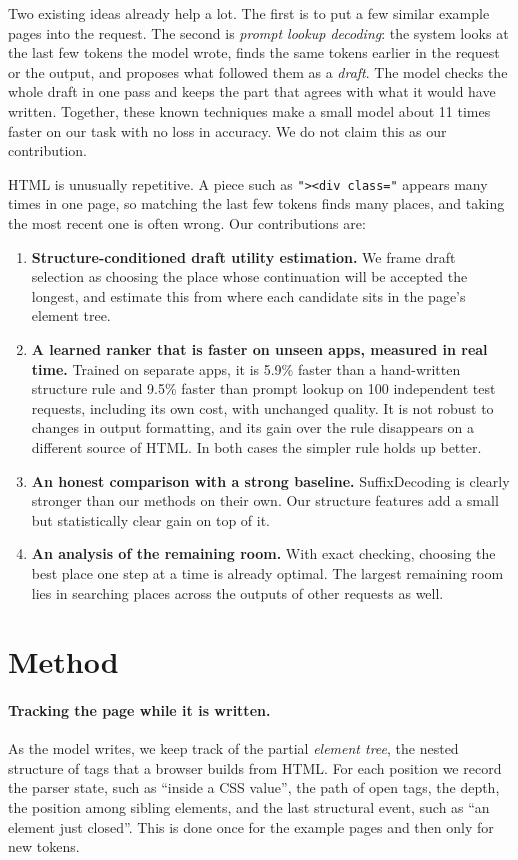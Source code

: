 \documentclass[10pt,a4paper]{article}
\begin{document}
Two existing ideas already help a lot. The first is to put a few similar example pages into the request. The second is \emph{prompt lookup decoding}: the system looks at the last few tokens the model wrote, finds the same tokens earlier in the request or the output, and proposes what followed them as a \emph{draft}. The model checks the whole draft in one pass and keeps the part that agrees with what it would have written. Together, these known techniques make a small model about 11 times faster on our task with no loss in accuracy. We do not claim this as our contribution.

HTML is unusually repetitive. A piece such as \texttt{"><div class="} appears many times in one page, so matching the last few tokens finds many places, and taking the most recent one is often wrong. Our contributions are:
\begin{enumerate}[itemsep=1pt]
\item \textbf{Structure-conditioned draft utility estimation.} We frame draft selection as choosing the place whose continuation will be accepted the longest, and estimate this from where each candidate sits in the page's element tree.
\item \textbf{A learned ranker that is faster on unseen apps, measured in real time.} Trained on separate apps, it is 5.9\% faster than a hand-written structure rule and 9.5\% faster than prompt lookup on 100 independent test requests, including its own cost, with unchanged quality. It is not robust to changes in output formatting, and its gain over the rule disappears on a different source of HTML. In both cases the simpler rule holds up better.
\item \textbf{An honest comparison with a strong baseline.} SuffixDecoding is clearly stronger than our methods on their own. Our structure features add a small but statistically clear gain on top of it.
\item \textbf{An analysis of the remaining room.} With exact checking, choosing the best place one step at a time is already optimal. The largest remaining room lies in searching places across the outputs of other requests as well.
\end{enumerate}

\section{Method}
\paragraph{Tracking the page while it is written.} As the model writes, we keep track of the partial \emph{element tree}, the nested structure of tags that a browser builds from HTML. For each position we record the parser state, such as ``inside a CSS value'', the path of open tags, the depth, the position among sibling elements, and the last structural event, such as ``an element just closed''. This is done once for the example pages and then only for new tokens.
\end{document}
